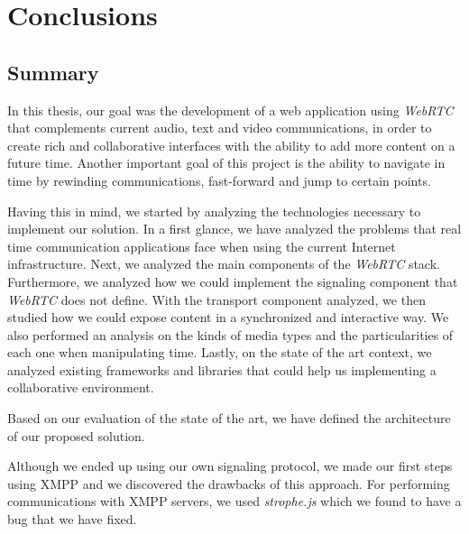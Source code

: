 \chapter{Conclusions}
\label{chapter:conclusion}

\section{Summary}
\label{section:summary}
In this thesis, our goal was the development of a web application using \emph{WebRTC} that complements current audio, text and video communications, in order to create rich and collaborative interfaces with the ability to add more content on a future time. Another important goal of this project is the ability to navigate in time by rewinding communications, fast-forward and jump to certain points.

Having this in mind, we started by analyzing the technologies necessary to implement our solution. In a first glance, we have analyzed the problems that real time communication applications face when using the current Internet infrastructure. Next, we analyzed the main components of the \emph{WebRTC} stack. Furthermore, we analyzed how we could implement the signaling component that \emph{WebRTC} does not define. With the transport component analyzed, we then studied how we could expose content in a synchronized and interactive way. We also performed an analysis on the kinds of media types and the particularities of each one when manipulating time. Lastly, on the state of the art context, we analyzed existing frameworks and libraries that could help us implementing a collaborative environment.

Based on our evaluation of the state of the art, we have defined the architecture of our proposed solution.



Although we ended up using our own signaling protocol, we made our first steps using \ac{XMPP} and we  discovered the drawbacks of this approach. For performing communications with \ac{XMPP} servers, we used \emph{strophe.js} which we found to have a bug that we have fixed.


